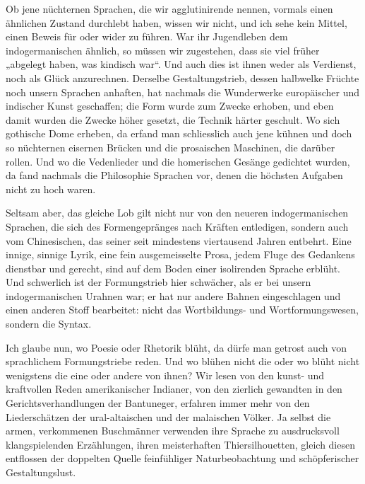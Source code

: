 Ob jene nüchternen Sprachen, die wir agglutinirende nennen, vormals einen ähnlichen Zustand durchlebt haben, wissen wir nicht, und ich sehe kein Mittel, einen Beweis für oder wider zu führen. War ihr Jugendleben dem indogermanischen ähnlich, so müssen wir zugestehen, dass sie viel früher „abgelegt haben, was kindisch war“. Und auch dies ist ihnen weder als Verdienst, noch als Glück anzurechnen. Derselbe Gestaltungstrieb, dessen halbwelke Früchte noch unsern Sprachen anhaften, hat nachmals die Wunderwerke europäischer und indischer Kunst geschaffen; die Form wurde zum Zwecke erhoben, und eben damit wurden die Zwecke höher gesetzt, die Technik härter geschult. Wo sich gothische Dome erheben, da erfand man schliesslich auch jene küh\label{fp.345}nen und doch so nüchternen eisernen Brücken und die prosaischen Maschinen, die darüber rollen. Und wo die Vedenlieder und die homerischen Gesänge gedichtet wurden, da fand nachmals die Philosophie Sprachen vor, denen die höchsten Aufgaben nicht zu hoch waren.

Seltsam aber, das gleiche Lob gilt nicht nur von den  neueren indogermanischen Sprachen, die sich des Formengepränges nach Kräften entledigen, sondern auch vom Chinesischen, das seiner seit mindestens viertausend Jahren entbehrt. Eine innige, sinnige Lyrik, eine  fein ausgemeisselte Prosa, jedem Fluge des Gedankens dienstbar und gerecht, sind auf dem Boden einer isolirenden Sprache erblüht. Und schwerlich ist der Formungstrieb hier schwächer, als er bei unsern indogermanischen Urahnen war; er hat nur andere Bahnen eingeschlagen und einen anderen Stoff bearbeitet: nicht das Wortbildungs- und Wortformungswesen, sondern die Syntax.

Ich glaube nun, wo Poesie oder Rhetorik blüht, da dürfe man getrost auch von sprachlichem Formungstriebe reden. Und wo blühen nicht die  oder wo blüht nicht wenigstens die eine oder andere von ihnen? Wir lesen von den kunst- und kraftvollen Reden amerikanischer Indianer, von den zierlich gewandten  in den Gerichtsverhandlungen der Bantuneger, erfahren immer mehr von den Liederschätzen der ural-altaischen und der malaischen Völker. Ja selbst die armen, verkommenen Buschmänner verwenden ihre  Sprache zu ausdrucksvoll klangspielenden Erzählungen,   ihren meisterhaften Thiersilhouetten, gleich diesen entflossen der doppelten Quelle feinfühliger Naturbeobachtung und schöpferischer Gestaltungslust.

